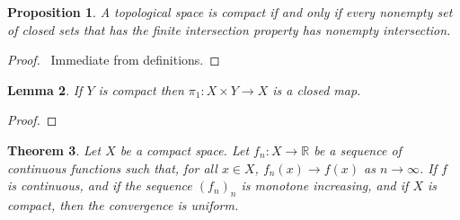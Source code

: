 \documentclass{report}
\let\qed\relax
\newtheorem{lm}{Lemma}[section]
\newtheorem{prop}[lm]{Proposition}
\newtheorem{thm}[lm]{Theorem}
\theoremstyle{definition}
\begin{document}
  \begin{prop}
    \label{prop:topology:compact:finite_intersection}
    A topological space is compact if and only if every nonempty set of closed
    sets that has the finite intersection property has nonempty intersection.
  \end{prop}

  \begin{proof}
    \pf\ Immediate from definitions. \qed
  \end{proof}

  \begin{lm}
    \label{lm:topology:compact:projection_closed}
    If $Y$ is compact then $\pi_1 : X \times Y \rightarrow X$ is a closed map.
  \end{lm}

  \begin{proof}
    \pf
    \qed
  \end{proof}

  \begin{thm}
    Let $X$ be a compact space.
    Let $f_n : X \rightarrow \mathbb{R}$ be a sequence of continuous functions
    such that, for all $x \in X$, $f_n(x) \rightarrow f(x)$ as $n \rightarrow
    \infty$. If $f$ is continuous, and if the sequence $(f_n)_n$ is monotone
    increasing, and if $X$ is compact, then the convergence is uniform.
  \end{thm}
\end{document}
